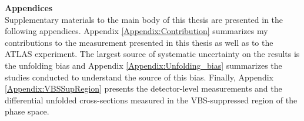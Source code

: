 \documentclass[red]{brandeis-dissertation}
\numberwithin{equation}{section}
\begin{document}
\doublespacing

\tableofcontents
\clearpage
{}
{}
\listoftables
\clearpage
{}
{}
\listoffigures
\clearpage


\clearpage


\startbody

\renewcommand{\partname}{Chapter}


\clearpage


	
	
	
	
\clearpage


	
	
	
	
\clearpage


	
	
	
	
	
	
\clearpage


\clearpage


\clearpage


\clearpage

% 
% 	
% 	

{\singlespacing
\renewcommand{\refname}{References}


\clearpage
}

\begin{appendices}
   \textbf{Appendices} \\ 
   \normalsize 
   Supplementary materials to the main body of this thesis are presented in the following appendices. Appendix \ref{Appendix:Contribution} summarizes my contributions to the measurement presented in this thesis as well as to the ATLAS experiment. The largest source of systematic uncertainty on the results is the unfolding bias and Appendix \ref{Appendix:Unfolding_bias} summarizes the studies conducted to understand the source of this bias. Finally, Appendix \ref{Appendix:VBSSupRegion} presents the detector-level measurements and the differential unfolded cross-sections measured in the VBS-suppressed region of the phase space. 
 

	
\end{appendices}
\end{document}
